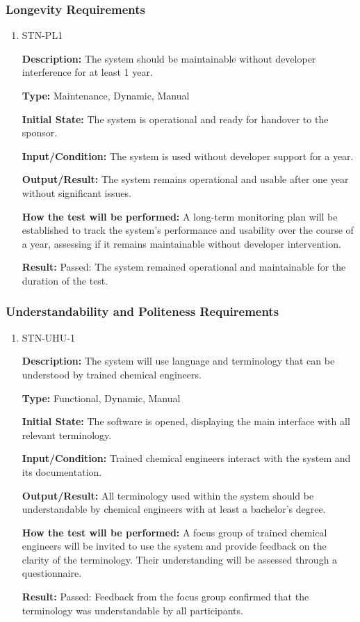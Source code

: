 \documentclass[12pt, titlepage]{article}
\begin{document}
\subsubsection{Longevity Requirements}

\begin{enumerate}

\item{STN-PL1\\}

\textbf{Description:} The system should be maintainable without developer interference for at least 1 year.

\textbf{Type:} Maintenance, Dynamic, Manual

\textbf{Initial State:} The system is operational and ready for handover to the sponsor.

\textbf{Input/Condition:} The system is used without developer support for a year.

\textbf{Output/Result:} The system remains operational and usable after one year without significant issues.

\textbf{How the test will be performed:} A long-term monitoring plan will be established to track the system’s performance and usability over the course of a year, assessing if it remains maintainable without developer intervention.

\textbf{Result:} Passed: The system remained operational and maintainable for the duration of the test.

\end{enumerate}

\subsubsection{Understandability and Politeness Requirements}

\begin{enumerate}

\item{STN-UHU-1\\}

\textbf{Description:} The system will use language and terminology that can be understood by trained chemical engineers.

\textbf{Type:} Functional, Dynamic, Manual

\textbf{Initial State:} The software is opened, displaying the main interface with all relevant terminology.

\textbf{Input/Condition:} Trained chemical engineers interact with the system and its documentation.

\textbf{Output/Result:} All terminology used within the system should be understandable by chemical engineers with at least a bachelor’s degree.

\textbf{How the test will be performed:} A focus group of trained chemical engineers will be invited to use the system and provide feedback on the clarity of the terminology. Their understanding will be assessed through a questionnaire.

\textbf{Result:} Passed: Feedback from the focus group confirmed that the terminology was understandable by all participants.

\end{enumerate}
\end{document}
